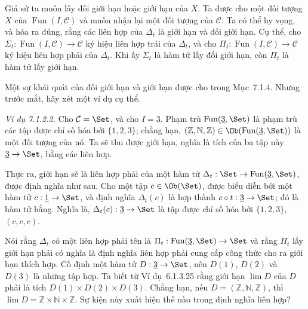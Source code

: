 Giả sử ta muốn lấy đối giới hạn hoặc giới hạn của $X$. Ta được cho một đối tượng $X$ của $\operatorname{Fun}(I,\mathcal C)$ và muốn nhận lại một đối tượng của $\mathcal C$. Ta có thể hy vọng, và hóa ra đúng, rằng các liên hợp của $\Delta_t$ là giới hạn và đối giới hạn. Cụ thể, cho $\Sigma_t:\operatorname{Fun}(I,\mathcal C)\to\mathcal C$ ký hiệu liên hợp trái của $\Delta_t$, và cho $\Pi_t:\operatorname{Fun}(I,\mathcal C)\to\mathcal C$ ký hiệu liên hợp phải của $\Delta_t$. Khi ấy $\Sigma_t$ là hàm tử lấy đối giới hạn, còn $\Pi_t$ là hàm tử lấy giới hạn.

Một sự khái quát của đối giới hạn và giới hạn được cho trong Mục~7.1.4. Nhưng trước mắt, hãy xét một ví dụ cụ thể.

\noindent\textit{Ví dụ 7.1.2.2.}\keepwithnext
Cho $\mathcal C=\Set$, và cho $I=\underline3$. Phạm trù $\operatorname{Fun}(\underline3,\Set)$ là phạm trù các tập được chỉ số hóa bởi $\{1,2,3\}$; chẳng hạn, $(\mathbb Z,\mathbb N,\mathbb Z)\in\Ob(\operatorname{Fun}(\underline3,\Set))$ là một đối tượng của nó. Ta sẽ thu được giới hạn, nghĩa là tích của ba tập này $\underline3\to\Set$, bằng các liên hợp.

Thực ra, giới hạn sẽ là liên hợp phải của một hàm tử $\Delta_t:\Set\to\operatorname{Fun}(\underline3,\Set)$, được định nghĩa như sau. Cho một tập $c\in\Ob(\Set)$, được biểu diễn bởi một hàm tử $c:\underline1\to\Set$, và định nghĩa $\Delta_t(c)$ là hợp thành $c\circ t:\underline3\to\Set$; đó là hàm tử hằng. Nghĩa là, $\Delta_t(c):\underline3\to\Set$ là tập được chỉ số hóa bởi $\{1,2,3\}$, $(c,c,c)$.

Nói rằng $\Delta_t$ có một liên hợp phải tên là $\Pi_t:\operatorname{Fun}(\underline3,\Set)\to\Set$ và rằng $\Pi_t$ lấy giới hạn phải có nghĩa là định nghĩa liên hợp phải cung cấp công thức cho ra giới hạn thích hợp. Cố định một hàm tử $D:\underline3\to\Set$, nên $D(1)$, $D(2)$ và $D(3)$ là những tập hợp. Ta biết từ Ví dụ~6.1.3.25 rằng giới hạn $\lim D$ của $D$ phải là tích $D(1)\times D(2)\times D(3)$. Chẳng hạn, nếu $D=(\mathbb Z,\mathbb N,\mathbb Z)$, thì $\lim D=\mathbb Z\times\mathbb N\times\mathbb Z$. Sự kiện này xuất hiện thế nào trong định nghĩa liên hợp?

